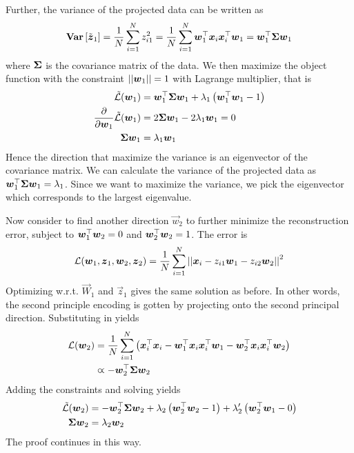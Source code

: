 Further, the variance of the projected data can be written as
\begin{align*}
	\mathbf{Var}\left[\tilde{\boldsymbol{z}}_1\right]=\frac{1}{N}\sum_{i=1}^Nz_{i1}^2=\frac{1}{N}\sum_{i=1}^N\boldsymbol{w}_1^\top\boldsymbol{x}_i\boldsymbol{x}_i^\top\boldsymbol{w}_1=\boldsymbol{w}_1^\top\mathbf{\Sigma}\boldsymbol{w}_1
\end{align*}
where $\mathbf{\Sigma}$ is the covariance matrix of the data. We then maximize the object function with the constraint $\left\vert\left\vert \boldsymbol{w}_1 \right\vert\right\vert=1$ with Lagrange multiplier, that is
\begin{align*}
	\tilde{\mathcal{L}}(\boldsymbol{w}_1)&=\boldsymbol{w}_1^\top\mathbf{\Sigma}\boldsymbol{w}_1+\lambda_1\left(\boldsymbol{w}_1^\top\boldsymbol{w}_1-1\right) \\
	\frac{\partial}{\partial\boldsymbol{w}_1}\tilde{\mathcal{L}}(\boldsymbol{w}_1)&=2\mathbf{\Sigma}\boldsymbol{w}_1-2\lambda_1\boldsymbol{w}_1=0 \\
	\mathbf{\Sigma}\boldsymbol{w}_1&=\lambda_1\boldsymbol{w}_1
\end{align*}
Hence the direction that maximize the variance is an eigenvector of the covariance matrix. We can calculate the variance of the projected data as $\boldsymbol{w}_1^\top\mathbf{\Sigma}\boldsymbol{w}_1=\lambda_1$. Since we want to maximize the variance, we pick the eigenvector which corresponds to the largest eigenvalue.

Now consider to find another direction $\vec{w}_2$ to further minimize the reconstruction error, subject to $\boldsymbol{w}_1^\top\boldsymbol{w}_2=0$ and $\boldsymbol{w}_2^\top\boldsymbol{w}_2=1$. The error is
\begin{align*}
	\mathcal{L}(\boldsymbol{w}_1,\boldsymbol{z}_1,\boldsymbol{w}_2,\boldsymbol{z}_2)=\frac{1}{N}\sum_{i=1}^N\left\vert\left\vert \boldsymbol{x}_i-z_{i1}\boldsymbol{w}_1-z_{i2}\boldsymbol{w}_2 \right\vert\right\vert^2
\end{align*}
Optimizing w.r.t. $\vec{W}_1$ and $\vec{z}_1$ gives the same solution as before. In other words, the second principle encoding is gotten by projecting onto the second principal direction. Substituting in yields
\begin{align*}
	\mathcal{L}(\boldsymbol{w}_2)&=\frac{1}{N}\sum_{i=1}^N\left(\boldsymbol{x}_i^\top\boldsymbol{x}_i-\boldsymbol{w}_1^\top\boldsymbol{x}_i\boldsymbol{x}_i^\top\boldsymbol{w}_1-\boldsymbol{w}_2^\top\boldsymbol{x}_i\boldsymbol{x}_i^\top\boldsymbol{w}_2\right) \\
	&\varpropto-\boldsymbol{w}_2^\top\mathbf{\Sigma}\boldsymbol{w}_2
\end{align*}
Adding the constraints and solving yields
\begin{align*}
	\tilde{\mathcal{L}}(\boldsymbol{w}_2)&=-\boldsymbol{w}_2^\top\mathbf{\Sigma}\boldsymbol{w}_2+\lambda_2\left(\boldsymbol{w}_2^\top\boldsymbol{w}_2-1\right)+\lambda_2'\left(\boldsymbol{w}_2^\top\boldsymbol{w}_1-0\right) \\
	\mathbf{\Sigma}\boldsymbol{w}_2&=\lambda_2\boldsymbol{w}_2
\end{align*}
The proof continues in this way.



